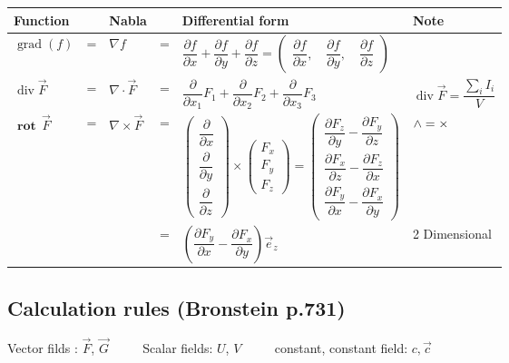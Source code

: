 \renewcommand{\arraystretch}{2}		
		\begin{tabularx}{\linewidth}{lllllX}
			\hline
			Function & &Nabla & &Differential form & Note \\
			\hline
			$\operatorname{grad}(f)$ &=& 
			$\nabla f$ &=&
			 $\dfrac{{\partial f}}{{\partial x}} +
			\dfrac{{\partial f}}{{\partial y}} + \dfrac{{\partial f}}{{\partial z}} = 
			\begin{pmatrix} \dfrac{\partial f}{\partial x}, \quad\dfrac{\partial f}{\partial
				y}, \quad \dfrac{\partial f}{\partial z} \end{pmatrix}$&\\	
			\hline 
			$\operatorname{div}\vec F$ &=& 
			$\nabla \cdot \vec F$&=&
			$\dfrac{\partial}{\partial x_1}F_1 + \dfrac{\partial}{\partial x_2}F_2+ \dfrac{\partial}{\partial x_3}F_3$&
			$\operatorname{div}\vec F = \dfrac{\sum_i I_i}{V}$\\
			\hline
			$\mathbf{\operatorname{rot}}\,\vec F$ &=& 
			$\nabla\times \vec F$ &=& 
			$\begin{pmatrix} \dfrac{\partial}{\partial x} \\ \dfrac{\partial}{\partial y} \\
				\dfrac{\partial}{\partial z} \end{pmatrix} \times \begin{pmatrix} F_x\\ F_y\\ F_z
			\end{pmatrix} = \begin{pmatrix} \dfrac{\partial F_z}{\partial y} - \dfrac{\partial
				F_y}{\partial z} \\ \dfrac{\partial F_x}{\partial z} - \dfrac{\partial
				F_z}{\partial x} \\ \dfrac{\partial F_y}{\partial x} - \dfrac{\partial
				F_x}{\partial y} \end{pmatrix}$&
			$\mathbf{\wedge = \times} \newline$\\ 
			&&
			&=&
			$ \left (\dfrac{\partial F_y}{\partial x} - \dfrac{\partial F_x}{\partial y}\right )\vec e_z$ & 2 Dimensional\\
			\hline
		\end{tabularx}

\renewcommand{\arraystretch}{1}				


	
	\subsection{Calculation rules (Bronstein p.731)}
	Vector filds : $\vec F$, $\vec G$  $\qquad$ 
	Scalar fields: $U$, $V$	           $\qquad$ 
	constant, constant field: $c, \vec{c}$
	
